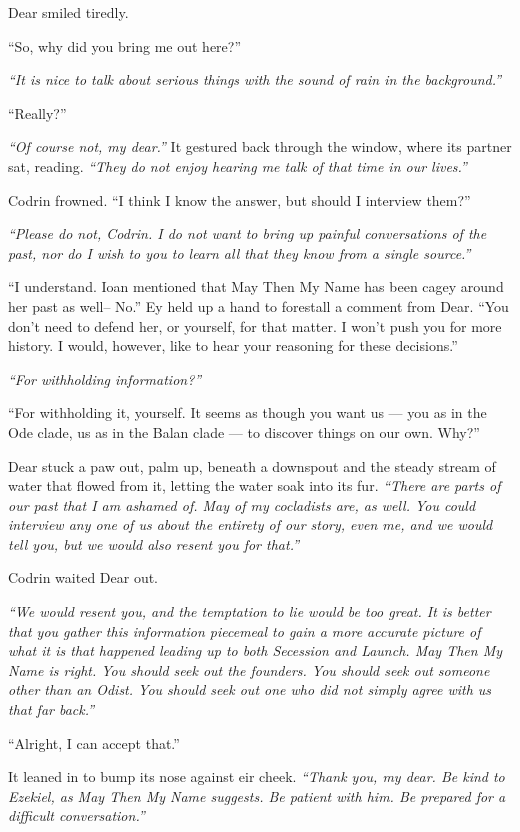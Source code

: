 Dear smiled tiredly.

``So, why did you bring me out here?''

\emph{``It is nice to talk about serious things with the sound of rain in the background.''}

``Really?''

\emph{``Of course not, my dear.''} It gestured back through the window, where its partner sat, reading. \emph{``They do not enjoy hearing me talk of that time in our lives.''}

Codrin frowned. ``I think I know the answer, but should I interview them?''

\emph{``Please do not, Codrin. I do not want to bring up painful conversations of the past, nor do I wish to you to learn all that they know from a single source.''}

``I understand. Ioan mentioned that May Then My Name has been cagey around her past as well-- No.'' Ey held up a hand to forestall a comment from Dear. ``You don't need to defend her, or yourself, for that matter. I won't push you for more history. I would, however, like to hear your reasoning for these decisions.''

\emph{``For withholding information?''}

``For withholding it, yourself. It seems as though you want us — you as in the Ode clade, us as in the Balan clade — to discover things on our own. Why?''

Dear stuck a paw out, palm up, beneath a downspout and the steady stream of water that flowed from it, letting the water soak into its fur. \emph{``There are parts of our past that I am ashamed of. May of my cocladists are, as well. You could interview any one of us about the entirety of our story, even me, and we would tell you, but we would also resent you for that.''}

Codrin waited Dear out.

\emph{``We would resent you, and the temptation to lie would be too great. It is better that you gather this information piecemeal to gain a more accurate picture of what it is that happened leading up to both Secession and Launch. May Then My Name is right. You should seek out the founders. You should seek out someone other than an Odist. You should seek out one who did not simply agree with us that far back.''}

``Alright, I can accept that.''

It leaned in to bump its nose against eir cheek. \emph{``Thank you, my dear. Be kind to Ezekiel, as May Then My Name suggests. Be patient with him. Be prepared for a difficult conversation.''}

